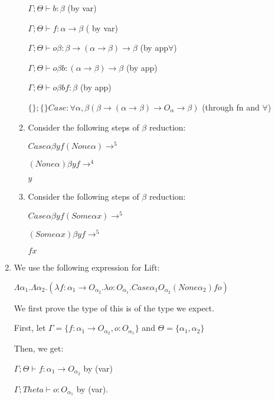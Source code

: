 \begin{enumerate}[label=(\alph*)]
\begin{enumerate}[label=(\roman*)]
        $\Gamma ; \Theta \vdash b :\beta$ (by var) 
        
        $\Gamma ; \Theta \vdash f : \alpha \rightarrow \beta$ ( by var)

        $\Gamma ; \Theta \vdash  o \beta : \beta \rightarrow (\alpha \rightarrow \beta) \rightarrow \beta$ (by app$\forall$)

        $\Gamma ; \Theta \vdash o \beta b : (\alpha \rightarrow \beta) \rightarrow \beta$ (by app)

        $\Gamma ; \Theta \vdash o \beta b f : \beta$ (by app)

        $\{\} ; \{\} Case : \forall \alpha, \beta(\beta \rightarrow (\alpha \rightarrow \beta) \rightarrow O_\alpha \rightarrow \beta)$ (through fn and $\forall$)


      \item
        Consider the following steps of $\beta$ reduction:

        $Case \alpha \beta y f (None \alpha) \rightarrow^5$

        $(None \alpha) \beta y f \rightarrow^4$

        $y$



      \item
        Consider the following steps of $\beta$ reduction:

        $Case \alpha \beta y f (Some \alpha x) \rightarrow^5$

        $(Some \alpha x) \beta y f \rightarrow^5$

        $f x$

        
    \end{enumerate}

  \item

    We use the following expression for Lift:

    $\Lambda \alpha_1. \Lambda \alpha_2. (\lambda f : \alpha_1 \rightarrow O_{\alpha_2}. \lambda o: O_{\alpha_1}. Case \alpha_1 O_{\alpha_2} (None \alpha_2) f o)$

    We first prove the type of this is of the type we expect.

    First, let $\Gamma = \{f : \alpha_1 \rightarrow O_{\alpha_2}, o :O_{\alpha_1}\}$ and $\Theta = \{\alpha_1, \alpha_2\}$

    Then, we get:

    $\Gamma ; \Theta \vdash f : \alpha_1 \rightarrow O_{\alpha_2}$ by (var)

    $\Gamma ; Theta \vdash o : O_{\alpha_1}$ by (var).


\end{enumerate}
